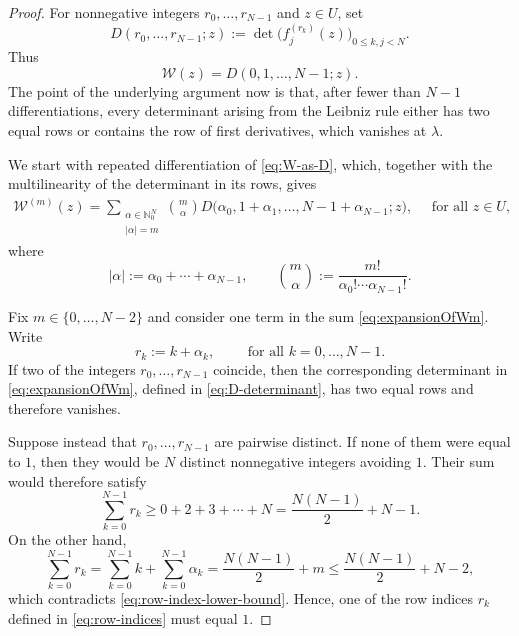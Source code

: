 \documentclass[10pt,a4paper]{amsart}
\newcommand{\N}{\mathbb N}
\newcommand{\cW}{\mathcal W}
\begin{document}
\begin{proof}
    For nonnegative integers $r_0,\ldots,r_{N-1}$ and $z\in U$, set
    \begin{equation}\label{eq:D-determinant}
        D(r_0,\ldots,r_{N-1};z)
        :=
        \det\bigl(f_j^{(r_k)}(z)\bigr)_{0\leq k,j<N}.
    \end{equation}
    Thus
    \begin{equation}\label{eq:W-as-D}
        \cW(z)=D(0,1,\ldots,N-1;z).
    \end{equation}
    The point of the underlying argument now is that, after fewer than $N-1$ differentiations, every determinant arising from the Leibniz rule either has two equal rows or contains the row of first derivatives, which vanishes at $\lambda$.
    
    We start with repeated differentiation of \eqref{eq:W-as-D}, which, together with the multilinearity of the determinant in its rows, gives
    \begin{align}\label{eq:expansionOfWm}
        \cW^{(m)}(z)
        =
        \sum_{\substack{\alpha\in\N_0^N\\ |\alpha|=m}}
        \binom{m}{\alpha}
        D\bigl(
            \alpha_0,
            1+\alpha_1,
            \ldots,
            N-1+\alpha_{N-1};
            z
        \bigr), \quad \text{ for all } z \in U,
    \end{align}
    where
    \begin{equation}
        |\alpha|:=\alpha_0+\cdots+\alpha_{N-1},
        \qquad
        \binom{m}{\alpha}
        :=
        \frac{m!}{\alpha_0!\cdots\alpha_{N-1}!}.
    \end{equation}
    
    Fix $m\in\{0,\ldots,N-2\}$ and consider one term in the sum \eqref{eq:expansionOfWm}. Write
    \begin{equation}\label{eq:row-indices}
        r_k:=k+\alpha_k,
        \qquad \text{ for all } k=0,\ldots,N-1.
    \end{equation}
    If two of the integers $r_0,\ldots,r_{N-1}$ coincide, then the corresponding determinant in \eqref{eq:expansionOfWm}, defined in \eqref{eq:D-determinant}, has two equal rows and therefore vanishes.
    
    Suppose instead that $r_0,\ldots,r_{N-1}$ are pairwise distinct. If none of them were equal to $1$, then they would be $N$ distinct nonnegative integers avoiding $1$. Their sum would therefore satisfy
    \begin{equation}\label{eq:row-index-lower-bound}
        \sum_{k=0}^{N-1}r_k
        \geq
        0+2+3+\cdots+N
        =
        \frac{N(N-1)}{2}+N-1.
    \end{equation}
    On the other hand,
    \begin{equation}\label{eq:row-index-upper-bound}
        \sum_{k=0}^{N-1}r_k
        =
        \sum_{k=0}^{N-1}k+\sum_{k=0}^{N-1}\alpha_k
        =
        \frac{N(N-1)}{2}+m
        \leq
        \frac{N(N-1)}{2}+N-2,
    \end{equation}
    which contradicts \eqref{eq:row-index-lower-bound}. Hence, one of the row indices $r_k$ defined in \eqref{eq:row-indices} must equal $1$.
    

\end{proof}
\end{document}
